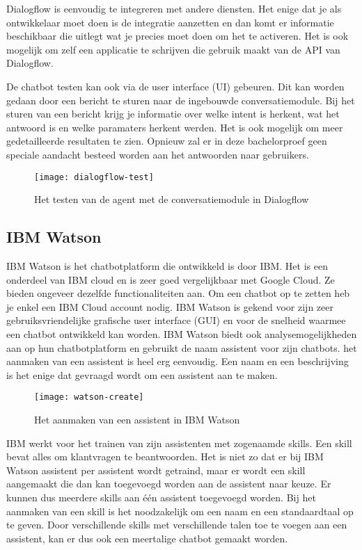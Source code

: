 Dialogflow is eenvoudig te integreren met andere diensten. Het enige dat je als ontwikkelaar moet doen is de integratie aanzetten en dan komt er informatie beschikbaar die uitlegt wat je precies moet doen om het te activeren. Het is ook mogelijk om zelf een applicatie te schrijven die gebruik maakt van de API van Dialogflow.

De chatbot testen kan ook via de user interface (UI) gebeuren. Dit kan worden gedaan door een bericht te sturen naar de ingebouwde conversatiemodule. Bij het sturen van een bericht krijg je informatie over welke intent is herkent, wat het antwoord is en welke paramaters herkent werden. Het is ook mogelijk om meer gedetailleerde resultaten te zien. Opnieuw zal er in deze bachelorproef geen speciale aandacht besteed worden aan het antwoorden naar gebruikers.

\begin{figure}[H]
    \label{fig:dialogflow-test}
    \centering
    \texttt{[image: dialogflow-test]}
    \caption{Het testen van de agent met de conversatiemodule in Dialogflow}
\end{figure}

\subsection{IBM Watson}
\label{subsec:werking-platformen-ibm-watson}

IBM Watson is het chatbotplatform die ontwikkeld is door IBM. Het is een onderdeel van IBM cloud en is zeer goed vergelijkbaar met Google Cloud. Ze bieden ongeveer dezelfde functionaliteiten aan. Om een chatbot op te zetten heb je enkel een IBM Cloud account nodig. IBM Watson is gekend voor zijn zeer gebruiksvriendelijke grafische user interface (GUI) en voor de snelheid waarmee een chatbot ontwikkeld kan worden. IBM Watson biedt ook analysemogelijkheden aan op hun chatbotplatform en gebruikt de naam assistent voor zijn chatbots. het aanmaken van een assistent is heel erg eenvoudig. Een naam en een beschrijving is het enige dat gevraagd wordt om een assistent aan te maken.

\begin{figure}[H]
    \label{fig:watson-create}
    \centering
    \texttt{[image: watson-create]}
    \caption{Het aanmaken van een assistent in IBM Watson}
\end{figure}

IBM werkt voor het trainen van zijn assistenten met zogenaamde skills. Een skill bevat alles om klantvragen te beantwoorden. Het is niet zo dat er bij IBM Watson assistent per assistent wordt getraind, maar er wordt een skill aangemaakt die dan kan toegevoegd worden aan de assistent naar keuze. Er kunnen dus meerdere skills aan één assistent toegevoegd worden. Bij het aanmaken van een skill is het noodzakelijk om een naam en een standaardtaal op te geven. Door verschillende skills met verschillende talen toe te voegen aan een assistent, kan er dus ook een meertalige chatbot gemaakt worden.

